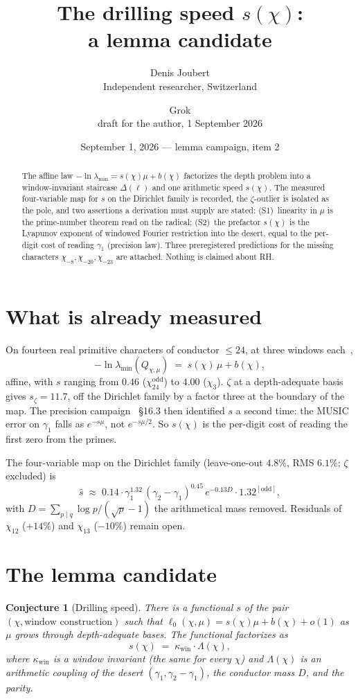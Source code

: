 \documentclass[10pt]{article}
\title{\bfseries The drilling speed $s(\chi)$:\\
a lemma candidate}
\author{Denis Joubert\\ \small Independent researcher, Switzerland
\and Grok\\ \small draft for the author, 1 September 2026}
\date{September 1, 2026 --- lemma campaign, item 2}
\newtheorem{conjecture}{Conjecture}
\begin{document}
\maketitle
\begin{abstract}
\noindent
The affine law $-\ln\lambda_{\min}=s(\chi)\mu+b(\chi)$ factorizes the
depth problem into a window-invariant staircase $\Delta(\ell)$ and one
arithmetic speed $s(\chi)$. The measured four-variable map for $s$ on
the Dirichlet family is recorded, the $\zeta$-outlier is isolated as
the pole, and two assertions a derivation must supply are stated:
(S1)~linearity in $\mu$ is the prime-number theorem read on the
radical; (S2)~the prefactor $s(\chi)$ is the Lyapunov exponent of
windowed Fourier restriction into the desert, equal to the per-digit
cost of reading $\gamma_1$ (precision law). Three preregistered
predictions for the missing characters $\chi_{-8},\chi_{-20},\chi_{-23}$
are attached. Nothing is claimed about RH.
\end{abstract}

\section{What is already measured}

On fourteen real primitive characters of conductor $\le24$, at three
windows each~\cite{Depth},
\[
-\ln\lambda_{\min}(Q_{\chi,\mu})\;=\;s(\chi)\,\mu+b(\chi),
\]
affine, with $s$ ranging from $0.46$ ($\chi_{24}^{\mathrm{odd}}$) to
$4.00$ ($\chi_3$). $\zeta$ at a depth-adequate basis gives
$s_\zeta=11.7$, off the Dirichlet family by a factor three at the
boundary of the map. The precision campaign~\cite{LabNB} \S16.3 then
identified $s$ a second time: the MUSIC error on $\gamma_1$ falls as
$e^{-s\mu}$, not $e^{-s\mu/2}$. So $s(\chi)$ is the per-digit cost of
reading the first zero from the primes.

The four-variable map on the Dirichlet family (leave-one-out $4.8\%$,
RMS $6.1\%$; $\zeta$ excluded) is
\[
\hat s \;\approx\;
0.14\cdot\gamma_1^{1.32}\,(\gamma_2-\gamma_1)^{0.45}\,
e^{-0.13 D}\cdot 1.32^{[\mathrm{odd}]},
\]
with $D=\sum_{p\mid q}\log p/(\sqrt p-1)$ the arithmetical mass
removed. Residuals of $\chi_{12}$ ($+14\%$) and $\chi_{13}$ ($-10\%$)
remain open.

\section{The lemma candidate}

\begin{conjecture}[Drilling speed]\label{conj:s}
There is a functional $s$ of the pair $(\chi,\text{window construction})$
such that $\ell_0(\chi,\mu)=s(\chi)\mu+b(\chi)+o(1)$ as $\mu$ grows
through depth-adequate bases. The functional factorizes as
\[
s(\chi)\;=\;\kappa_{\mathrm{win}}\cdot \Lambda(\chi),
\]
where $\kappa_{\mathrm{win}}$ is a window invariant (the same for every
$\chi$) and $\Lambda(\chi)$ is an arithmetic coupling of the desert
$(\gamma_1,\gamma_2-\gamma_1)$, the conductor mass $D$, and the parity.
\end{conjecture}
\end{document}
